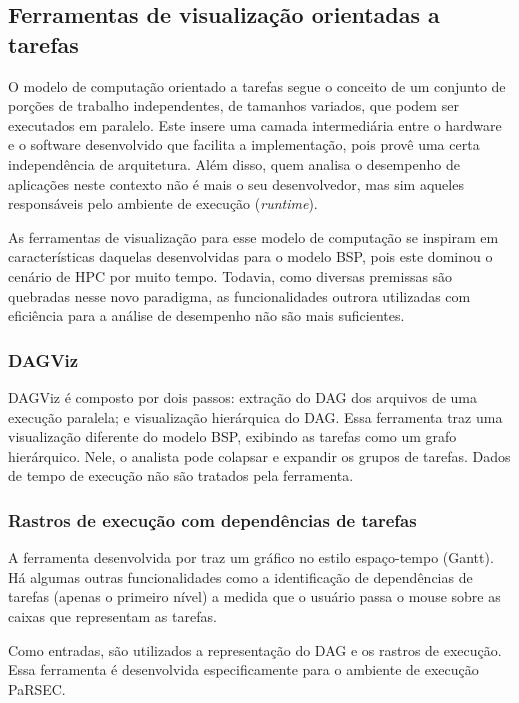 \subsection{Ferramentas de visualização orientadas a tarefas}

O modelo de computação orientado a tarefas segue o conceito de um conjunto de 
porções de trabalho independentes, de tamanhos variados, que podem ser 
executados em paralelo. Este insere uma camada intermediária entre o 
hardware e o software desenvolvido que facilita a implementação, pois provê uma 
certa independência de arquitetura. Além disso, quem analisa o desempenho de 
aplicações neste contexto não é mais o seu desenvolvedor, mas sim aqueles 
responsáveis pelo ambiente de execução (\textit{runtime}).

As ferramentas de visualização para esse modelo de computação se inspiram em 
características daquelas desenvolvidas para o modelo BSP, pois este dominou o 
cenário de HPC por muito tempo. Todavia, como diversas premissas são quebradas 
nesse novo paradigma, as funcionalidades outrora utilizadas com eficiência 
para a análise de desempenho não são mais suficientes.

\subsubsection*{DAGViz}

DAGViz \cite{ref:dagviz} é composto por dois passos: extração do DAG dos 
arquivos de uma execução paralela; e visualização hierárquica do DAG. Essa 
ferramenta traz uma visualização diferente do modelo BSP, exibindo as 
tarefas como um grafo hierárquico. Nele, o analista pode colapsar e expandir os 
grupos de tarefas. Dados de tempo de execução não são tratados pela ferramenta.

\subsubsection*{Rastros de execução com dependências de tarefas}

A ferramenta desenvolvida por \citet{ref:visuexecdep} traz um gráfico no estilo 
espaço-tempo (Gantt). Há algumas outras funcionalidades como a identificação de 
dependências de tarefas (apenas o primeiro nível) a medida que o usuário passa o 
mouse sobre as caixas que representam as tarefas.

Como entradas, são utilizados a representação do DAG e os rastros de 
execução. Essa ferramenta é desenvolvida especificamente para o 
ambiente de execução PaRSEC.

